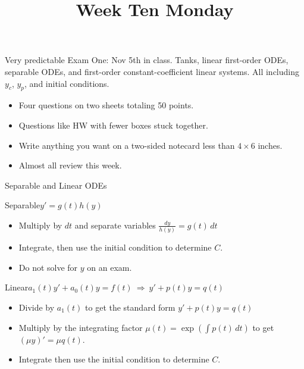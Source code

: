 \documentclass[11pt,aspectratio=169]{beamer}
\title{Week Ten Monday}
\date{}
\begin{document}
\begin{frame}{Very predictable Exam One: Nov 5th in class.}
Tanks, linear first-order ODEs, separable ODEs, 
and first-order constant-coefficient linear systems.  All including 
$y_c$, $y_p$, and initial conditions. 
  \begin{itemize}
  	\item Four questions on two sheets totaling 50 points.
  	\item Questions like HW with fewer boxes stuck together.
  	\item Write anything you want on a two-sided 
  	notecard less than $4\times6$ inches. 
  	\item Almost all review this week.
  \end{itemize}
\end{frame}
\begin{frame}{Separable and Linear ODEs}
\begin{block}{Separable\quad $y'=g(t)h(y)$}
\begin{itemize}
  \item Multiply by $dt$ and separate variables
  $\frac{dy}{h(y)}=g(t)\,dt$
  \item Integrate, then use the initial condition to determine $C$.
  \item Do not solve for $y$ on an exam. 
\end{itemize}
\end{block}
\begin{block}{Linear\quad $a_1(t)y'+a_0(t)y=f(t)\ \Longrightarrow\ y'+p(t)y=q(t)$}
\begin{itemize}
  \item Divide by $a_1(t)$ to get the 
  standard form $y'+p(t)y=q(t)$ 
  \item Multiply by the integrating factor
  $\mu(t)=\exp\left(\int p(t)\,dt\right)$ to get $(\mu y)'=\mu q(t)$.
  \item Integrate then use the initial condition to determine $C$.
\end{itemize}
\end{block}
\end{frame}
\end{document}

